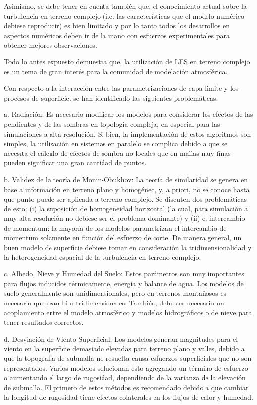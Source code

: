 Asimismo, se debe tener en cuenta también que, el conocimiento actual sobre la turbulencia en terreno complejo (i.e. las características que el modelo numérico debiese reproducir) es bien limitado y por lo tanto todos los desarrollos en aspectos numéricos deben ir de la mano con esfuerzos experimentales para obtener mejores observaciones.

Todo lo antes expuesto demuestra que, la utilización de LES en terreno complejo es un tema de gran interés para la comunidad de modelación atmosférica.

Con respecto a la interacción entre las parametrizaciones de capa límite y los procesos de superficie, se han identificado las siguientes problemáticas:
\begin{enumerate*}
	\item[a.] Radiación: Es necesario modificar los modelos para considerar los efectos de las pendientes y de las sombras en topología compleja, en especial para las simulaciones a alta resolución. Si bien, la implementación de estos algoritmos son simples, la utilización en sistemas en paralelo se complica debido a que se necesita el cálculo de efectos de sombra no locales que en mallas muy finas pueden significar una gran cantidad de puntos.
	\item[b.] Validez de la teoría de Monin-Obukhov: La teoría de similaridad se genera en base a información en terreno plano y homogéneo, y, a priori, no se conoce hasta que punto puede ser aplicada a terreno complejo. Se discuten dos problemáticas de esto: (i) la suposición de homogeneidad horizontal (la cual, para simulación a muy alta resolución no debiese ser el problema dominante) y (ii) el intercambio de momentum: la mayoría de los modelos parametrizan el intercambio de momentum solamente en función del esfuerzo de corte. De manera general, un buen modelo de superficie debiese tomar en consideración la tridimensionalidad y la heterogeneidad espacial de la turbulencia en terreno complejo.
	\item[c.] Albedo, Nieve y Humedad del Suelo: Estos parámetros son muy importantes para flujos inducidos térmicamente, energía y balance de agua. Los modelos de suelo generalmente son unidimensionales, pero en terrenos montañosos es necesario  que sean bi o tridimensionales. También, debe ser necesario un acoplamiento entre el modelo atmosférico  y modelos hidrográficos o de nieve para tener resultados correctos. 
	\item[d.] Desviación de Viento Superficial: Los modelos generan magnitudes para el viento en la superficie demasiado elevadas para terreno plano y valles, debido a que la topografía de submalla no resuelta causa esfuerzos superficiales que no son representados. Varios modelos solucionan esto agregando un término de esfuerzo o aumentando el largo de rugosidad, dependiendo de la varianza de la elevación de submalla. El primero de estos métodos es recomendado debido a que cambiar la longitud de rugosidad tiene efectos colaterales en los flujos de calor y humedad.

\end{enumerate*}
